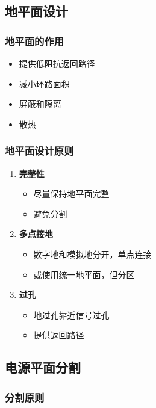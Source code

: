 \subsection{地平面设计}

\subsubsection{地平面的作用}

\begin{itemize}
  \item 提供低阻抗返回路径
  \item 减小环路面积
  \item 屏蔽和隔离
  \item 散热
\end{itemize}

\subsubsection{地平面设计原则}

\begin{enumerate}
  \item \textbf{完整性}
    \begin{itemize}
      \item 尽量保持地平面完整
      \item 避免分割
    \end{itemize}

  \item \textbf{多点接地}
    \begin{itemize}
      \item 数字地和模拟地分开，单点连接
      \item 或使用统一地平面，但分区
    \end{itemize}

  \item \textbf{过孔}
    \begin{itemize}
      \item 地过孔靠近信号过孔
      \item 提供返回路径
    \end{itemize}
\end{enumerate}

\subsection{电源平面分割}

\subsubsection{分割原则}

